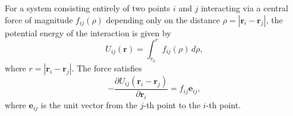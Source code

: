 For a system consisting entirely of two points $i$ and $j$ interacting via a central force of magnitude $f_{ij}(\rho)$ depending only on the distance $\rho = |\mathbf{r}_i - \mathbf{r}_j|$, the potential energy of the interaction is given by
$$U_{ij}(\mathbf{r}) = \int_{r_0}^{r} f_{ij}(\rho) \, d\rho,$$
where $r = |\mathbf{r}_i - \mathbf{r}_j|$. The force satisfies
$$-\frac{\partial U_{ij}(\mathbf{r}_i - \mathbf{r}_j)}{\partial \mathbf{r}_i} = f_{ij} \mathbf{e}_{ij},$$
where $\mathbf{e}_{ij}$ is the unit vector from the $j$-th point to the $i$-th point.
